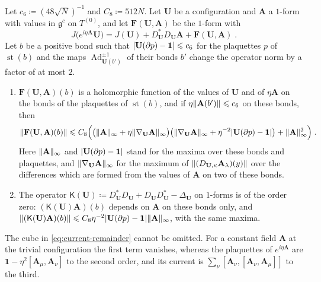 \documentclass[11pt]{preprint}
\newcommand{\id}{\mathbf 1}
\newcommand{\Ad}{\operatorname{Ad}}
\DeclarePairedDelimiter{\abs}{\lvert}{\rvert}
\DeclarePairedDelimiter{\norm}{\lVert}{\rVert}
\numberwithin{equation}{section}
\begin{document}
\begin{lemma}\label{lem:current-expansion}
Let $c_6 \coloneqq (48\sqrt N)^{-1}$ and $C_8 \coloneqq 512N$. Let $\mathbf U$ be a configuration and $\mathbf A$ a $1$-form with values in $\mathfrak g^c$ on $T^{(0)}$, and let $\mathbf F(\mathbf U, \mathbf A)$ be the $1$-form with
\begin{equation}\label{eq:current-expansion}
    J\bigl(e^{i\eta\mathbf A}\mathbf U\bigr) = J(\mathbf U) + D^*_{\mathbf U}D_{\mathbf U}\mathbf A + \mathbf F(\mathbf U, \mathbf A)\;.
\end{equation}
Let $b$ be a positive bond such that $\abs{\mathbf U(\partial p) - \id} \leqslant c_6$ for the plaquettes $p$ of $\operatorname{st}(b)$ and the maps $\Ad_{\mathbf U(b')}^{\pm1}$ of their bonds $b'$ change the operator norm by a factor of at most $2$.
\begin{enumerate}[label=(\roman*)]
\item $\mathbf F(\mathbf U, \mathbf A)(b)$ is a holomorphic function of the values of $\mathbf U$ and of $\eta\mathbf A$ on the bonds of the plaquettes of $\operatorname{st}(b)$, and if $\eta\norm{\mathbf A(b')} \leqslant c_6$ on these bonds, then
\begin{equation}\label{eq:current-remainder}
    \norm{\mathbf F(\mathbf U, \mathbf A)(b)} \leqslant C_8\Bigl(\bigl(\norm{\mathbf A}_\infty + \eta\norm{\nabla_{\mathbf U}\mathbf A}_\infty\bigr)\bigl(\norm{\nabla_{\mathbf U}\mathbf A}_\infty + \eta^{-2}\abs{\mathbf U(\partial p) - \id}\bigr) + \norm{\mathbf A}_\infty^3\Bigr)\;.
\end{equation}
Here $\norm{\mathbf A}_\infty$ and $\abs{\mathbf U(\partial p) - \id}$ stand for the maxima over these bonds and plaquettes, and $\norm{\nabla_{\mathbf U}\mathbf A}_\infty$ for the maximum of $\norm{(D_{\mathbf U,\kappa}\mathbf A_\lambda)(y)}$ over the differences which are formed from the values of $\mathbf A$ on two of these bonds.
\item The operator $\mathsf K(\mathbf U) \coloneqq D^*_{\mathbf U}D_{\mathbf U} + D_{\mathbf U}D^*_{\mathbf U} - \Delta_{\mathbf U}$ on $1$-forms is of the order zero: $(\mathsf K(\mathbf U)\mathbf A)(b)$ depends on $\mathbf A$ on these bonds only, and $\norm{(\mathsf K(\mathbf U)\mathbf A)(b)} \leqslant C_8\eta^{-2}\abs{\mathbf U(\partial p) - \id}\norm{\mathbf A}_\infty$, with the same maxima.
\end{enumerate}
\end{lemma}

The cube in \eqref{eq:current-remainder} cannot be omitted. For a constant field $\mathbf A$ at the trivial configuration the first term vanishes, whereas the plaquettes of $e^{i\eta\mathbf A}$ are $\id - \eta^2[\mathbf A_\mu, \mathbf A_\nu]$ to the second order, and its current is $\sum_\nu[\mathbf A_\nu, [\mathbf A_\nu, \mathbf A_\mu]]$ to the third.
\end{document}
